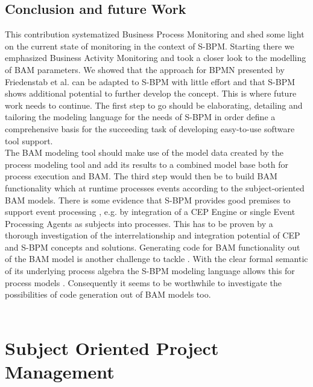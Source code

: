 \subsection {Conclusion and future Work}
This contribution systematized Business Process Monitoring and shed some light on the current state of monitoring in the context of S-BPM. Starting there we emphasized Business Activity Monitoring and took a closer look to the modelling of BAM parameters. We showed that the approach for BPMN presented by Friedenstab et al. can be adapted to S-BPM with little effort and that S-BPM shows additional potential to further develop the concept.
This is where future work needs to continue. The first step to go should be elaborating, detailing and tailoring the modeling language for the needs of S-BPM in order define a comprehensive basis for the succeeding task of developing easy-to-use software tool support. 
\\
The BAM modeling tool should make use of the model data created by the process modeling tool and add its results to a combined model base both for process execution and BAM. The third step would then be to build BAM functionality which at runtime processes events according to the subject-oriented BAM models. There is some evidence that S-BPM provides good premises to support event processing \cite{article:nondeterministicEvents}, e.g. by integration of a CEP Engine or single Event Processing Agents as subjects into processes. This has to be proven by a thorough investigation of the interrelationship and integration potential of CEP and S-BPM concepts and solutions. Generating code for BAM functionality out of the BAM model is another challenge to tackle \cite{article:BPMNActivityMon}. With the clear formal semantic of its underlying process algebra the S-BPM modeling language allows this for process models \cite{Flei12}. Consequently it seems to be worthwhile to investigate the possibilities of code generation out of BAM models too. 
\\
\\

\section{Subject Oriented Project Management}

